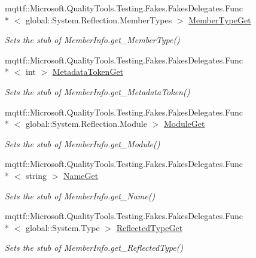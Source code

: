 \begin{DoxyCompactItemize}
mqttf\-::\-Microsoft.\-Quality\-Tools.\-Testing.\-Fakes.\-Fakes\-Delegates.\-Func\\*
$<$ global\-::\-System.\-Reflection.\-Member\-Types $>$ \hyperlink{class_system_1_1_reflection_1_1_fakes_1_1_stub_member_info_a2f5309aca05eca5468c601f5c2a8879d}{Member\-Type\-Get}
\begin{DoxyCompactList}\small\item\em Sets the stub of Member\-Info.\-get\-\_\-\-Member\-Type()\end{DoxyCompactList}\item 
mqttf\-::\-Microsoft.\-Quality\-Tools.\-Testing.\-Fakes.\-Fakes\-Delegates.\-Func\\*
$<$ int $>$ \hyperlink{class_system_1_1_reflection_1_1_fakes_1_1_stub_member_info_a03563ccf04c3c91ca6bd2c65e13297ec}{Metadata\-Token\-Get}
\begin{DoxyCompactList}\small\item\em Sets the stub of Member\-Info.\-get\-\_\-\-Metadata\-Token()\end{DoxyCompactList}\item 
mqttf\-::\-Microsoft.\-Quality\-Tools.\-Testing.\-Fakes.\-Fakes\-Delegates.\-Func\\*
$<$ global\-::\-System.\-Reflection.\-Module $>$ \hyperlink{class_system_1_1_reflection_1_1_fakes_1_1_stub_member_info_a16881ac8af3fd0d13ea472a46bdd959c}{Module\-Get}
\begin{DoxyCompactList}\small\item\em Sets the stub of Member\-Info.\-get\-\_\-\-Module()\end{DoxyCompactList}\item 
mqttf\-::\-Microsoft.\-Quality\-Tools.\-Testing.\-Fakes.\-Fakes\-Delegates.\-Func\\*
$<$ string $>$ \hyperlink{class_system_1_1_reflection_1_1_fakes_1_1_stub_member_info_aaeb1b3f1585f9e2f705465860ebbaca3}{Name\-Get}
\begin{DoxyCompactList}\small\item\em Sets the stub of Member\-Info.\-get\-\_\-\-Name()\end{DoxyCompactList}\item 
mqttf\-::\-Microsoft.\-Quality\-Tools.\-Testing.\-Fakes.\-Fakes\-Delegates.\-Func\\*
$<$ global\-::\-System.\-Type $>$ \hyperlink{class_system_1_1_reflection_1_1_fakes_1_1_stub_member_info_aff4209c9d65b00d7dd0bb3b5e261342a}{Reflected\-Type\-Get}
\begin{DoxyCompactList}\small\item\em Sets the stub of Member\-Info.\-get\-\_\-\-Reflected\-Type()\end{DoxyCompactList}\end{DoxyCompactItemize}

